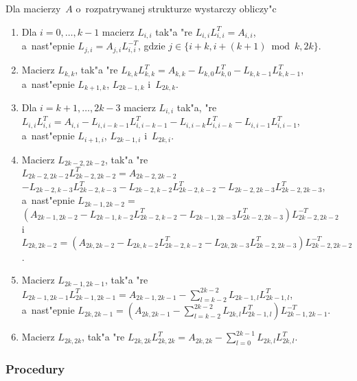 \vspace{\bigskipamount}

Dla macierzy~$A$ o~rozpatrywanej strukturze wystarczy obliczy"c
\begin{enumerate}
  \item Dla $i=0,\ldots,k-1$ macierz $L_{i,i}$ tak"a "re $L_{i,i}L_{i,i}^T=A_{i,i}$, \\
    a~nast"epnie $L_{j,i}=A_{j,i}L_{i,i}^{-T}$, gdzie $j\in\{i+k,i+(k+1)\bmod k,2k\}$.
  \item Macierz $L_{k,k}$, tak"a "re
    $L_{k,k}L_{k,k}^T=A_{k,k}-L_{k,0}L_{k,0}^T-L_{k,k-1}L_{k,k-1}^T$, \\ a~nast"epnie
    $L_{k+1,k}$, $L_{2k-1,k}$ i~$L_{2k,k}$.
  \item Dla $i=k+1,\ldots,2k-3$ macierz $L_{i,i}$ tak"a, "re \\
    $L_{i,i}L_{i,i}^T=A_{i,i}-L_{i,i-k-1}L_{i,i-k-1}^T-L_{i,i-k}L_{i,i-k}^T-L_{i,i-1}L_{i,i-1}^T$, \\
    a~nast"epnie $L_{i+1,i}$, $L_{2k-1,i}$ i~$L_{2k,i}$.
  \item Macierz $L_{2k-2,2k-2}$, tak"a "re \\
    $L_{2k-2,2k-2}L_{2k-2,2k-2}^T=A_{2k-2,2k-2}$ \\
    $-L_{2k-2,k-3}L_{2k-2,k-3}^T-L_{2k-2,k-2}L_{2k-2,k-2}^T-L_{2k-2,2k-3}L_{2k-2,2k-3}^T$, \\
    a~nast"epnie $L_{2k-1,2k-2} =$ \\
    $(A_{2k-1,2k-2}-L_{2k-1,k-2}L_{2k-2,k-2}^T-L_{2k-1,2k-3}L_{2k-2,2k-3}^T)L_{2k-2,2k-2}^{-T}$ \\
    i~$L_{2k,2k-2}=
    (A_{2k,2k-2}-L_{2k,k-2}L_{2k-2,k-2}^T-L_{2k,2k-3}L_{2k-2,2k-3}^T)L_{2k-2,2k-2}^{-T}$.
  \item Macierz $L_{2k-1,2k-1}$, tak"a "re \\
    $L_{2k-1,2k-1}L_{2k-1,2k-1}^T=A_{2k-1,2k-1}-\sum_{l=k-2}^{2k-2}L_{2k-1,l}L_{2k-1,l}^T$, \\
    a~nast"epnie $L_{2k,2k-1} = (A_{2k,2k-1}-\sum_{l=k-2}^{2k-2}L_{2k,l}L_{2k-1,l}^T)L_{2k-1,2k-1}^{-T}$.
  \item Macierz $L_{2k,2k}$, tak"a "re
    $L_{2k,2k}L_{2k,2k}^T=A_{2k,2k}-\sum_{l=0}^{2k-1}L_{2k,l}L_{2k,l}^T$.
\end{enumerate}

\subsubsection*{Procedury}

\vspace{\bigskipamount}

